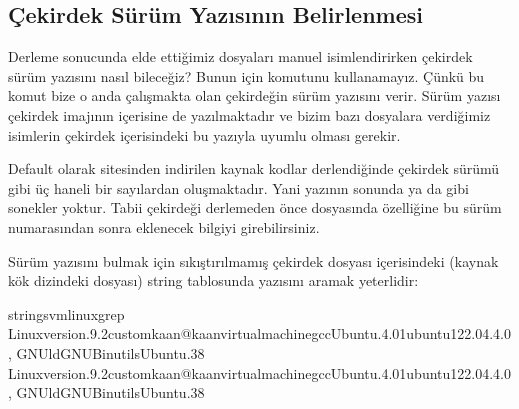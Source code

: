 \documentclass[a4paper,10pt,turkish]{sphinxmanual}
\begin{document}
\subsection{Çekirdek Sürüm Yazısının Belirlenmesi}
\label{\detokenize{kernelcompilation:cekirdek-surum-yazisinin-belirlenmesi}}
\sphinxAtStartPar
Derleme sonucunda elde ettiğimiz dosyaları manuel isimlendirirken çekirdek sürüm yazısını nasıl
bileceğiz? Bunun için  komutunu kullanamayız. Çünkü bu komut bize o anda çalışmakta
olan çekirdeğin sürüm yazısını verir. Sürüm yazısı çekirdek imajının içerisine de yazılmaktadır ve
bizim bazı dosyalara verdiğimiz isimlerin çekirdek içerisindeki bu yazıyla uyumlu olması gerekir.

\sphinxAtStartPar
Default olarak  sitesinden indirilen kaynak kodlar derlendiğinde çekirdek sürümü
 gibi üç haneli bir sayılardan oluşmaktadır. Yani yazının sonunda  ya da
 gibi sonekler yoktur. Tabii çekirdeği derlemeden önce  dosyasında
 özelliğine bu sürüm numarasından sonra eklenecek bilgiyi girebilirsiniz.

\sphinxAtStartPar
Sürüm yazısını bulmak için sıkıştırılmamış çekirdek dosyası içerisindeki (kaynak kök dizindeki
 dosyası) string tablosunda  yazısını aramak yeterlidir:

\begin{sphinxVerbatim}[commandchars=\\\{\}]
\PYGZdl{}stringsvmlinuxgrep
Linuxversion.9.2\PYGZhy{}customkaan@kaan\PYGZhy{}virtual\PYGZhy{}machinegccUbuntu.4.0\PYGZhy{}1ubuntu1\PYGZti{}22.04.4.0,
GNUldGNUBinutilsUbuntu.38
Linuxversion.9.2\PYGZhy{}customkaan@kaan\PYGZhy{}virtual\PYGZhy{}machinegccUbuntu.4.0\PYGZhy{}1ubuntu1\PYGZti{}22.04.4.0,
GNUldGNUBinutilsUbuntu.38
\end{sphinxVerbatim}
\end{document}
